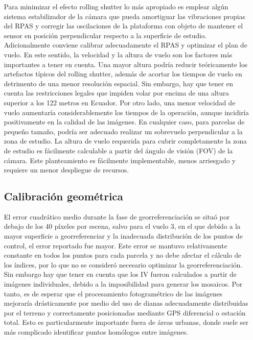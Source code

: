 \documentclass[spanish,openany]{article}
\begin{document}
Para minimizar el efecto rolling shutter lo más apropiado es emplear
algún sistema estabilizador de la cámara que pueda amortiguar las
vibraciones propias del RPAS y corregir las oscilaciones de la
plataforma con objeto de mantener el sensor en posición perpendicular
respecto a la superficie de estudio. Adicionalmente conviene calibrar
adecuadamente el RPAS y optimizar el plan de vuelo. En este sentido, la
velocidad y la altura de vuelo son los factores más importantes a tener
en cuenta. Una mayor altura podría reducir teóricamente los artefactos
típicos del rolling shutter, además de acortar los tiempos de vuelo en
detrimento de una menor resolución espacial. Sin embargo, hay que tener
en cuenta las restricciones legales que impiden volar por encima de una
altura superior a los 122 metros en Ecuador. Por otro lado, una menor
velocidad de vuelo aumentaría considerablemente los tiempos de la
operación, aunque incidiría positivamente en la calidad de las imágenes.
En cualquier caso, para parcelas de pequeño tamaño, podría ser adecuado
realizar un sobrevuelo perpendicular a la zona de estudio. La altura de
vuelo requerida para cubrir completamente la zona de estudio es
fácilmente calculable a partir del ángulo de visión (FOV) de la cámara.
Este planteamiento es fácilmente implementable, menos arriesgado y
requiere un menor despliegue de recursos.

\subsection{Calibración geométrica}\label{calibracion-geometrica}

El error cuadrático medio durante la fase de georreferenciación se situó
por debajo de los 40 píxeles por escena, salvo para el vuelo 3, en el
que debido a la mayor superficie a georreferenciar y la inadecuada
distribución de los puntos de control, el error reportado fue mayor.
Este error se mantuvo relativamente constante en todos los puntos para
cada parcela y no debe afectar el cálculo de los índices, por lo que no
se consideró necesario optimizar la georreferenciación. Sin embargo hay
que tener en cuenta que los IV fueron calculados a partir de imágenes
individuales, debido a la imposibilidad para generar los mosaicos. Por
tanto, es de esperar que el procesamiento fotogramétrico de las imágenes
mejoraría drásticamente por medio del uso de dianas adecuadamente
distribuidas por el terreno y correctamente posicionadas mediante GPS
diferencial o estación total. Esto es particularmente importante fuera
de áreas urbanas, donde suele ser más complicado identificar puntos
homólogos entre imágenes.
\end{document}
